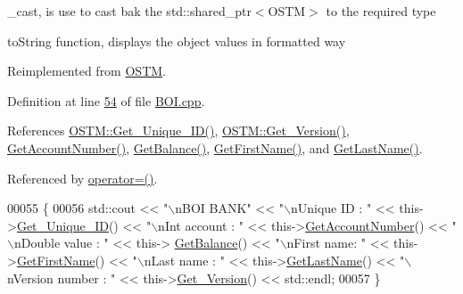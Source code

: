 \+\_\+cast, is use to cast bak the std\+::shared\+\_\+ptr$<$\+O\+S\+T\+M$>$ to the required type 

to\+String function, displays the object values in formatted way 

Reimplemented from \hyperlink{class_o_s_t_m_a513396a115f2987fd07c203309ae8a59_a513396a115f2987fd07c203309ae8a59}{O\+S\+TM}.



Definition at line \hyperlink{_b_o_i_8cpp_source_l00054}{54} of file \hyperlink{_b_o_i_8cpp_source}{B\+O\+I.\+cpp}.



References \hyperlink{_o_s_t_m_8cpp_source_l00073}{O\+S\+T\+M\+::\+Get\+\_\+\+Unique\+\_\+\+I\+D()}, \hyperlink{_o_s_t_m_8cpp_source_l00089}{O\+S\+T\+M\+::\+Get\+\_\+\+Version()}, \hyperlink{_b_o_i_8cpp_source_l00078}{Get\+Account\+Number()}, \hyperlink{_b_o_i_8cpp_source_l00070}{Get\+Balance()}, \hyperlink{_b_o_i_8cpp_source_l00094}{Get\+First\+Name()}, and \hyperlink{_b_o_i_8cpp_source_l00086}{Get\+Last\+Name()}.



Referenced by \hyperlink{_b_o_i_8h_source_l00065}{operator=()}.


\begin{DoxyCode}
00055 \{
00056    std::cout << \textcolor{stringliteral}{"\(\backslash\)nBOI BANK"} << \textcolor{stringliteral}{"\(\backslash\)nUnique ID : "} << this->\hyperlink{class_o_s_t_m_a5a01a8b98d16b1d1904ecf9356e7b71d_a5a01a8b98d16b1d1904ecf9356e7b71d}{Get\_Unique\_ID}() << \textcolor{stringliteral}{"\(\backslash\)nInt account : 
      "} << this->\hyperlink{class_b_o_i_a5b18e1538f3d37835234946cdf9f240f_a5b18e1538f3d37835234946cdf9f240f}{GetAccountNumber}() << \textcolor{stringliteral}{"\(\backslash\)nDouble value : "} << this->
      \hyperlink{class_b_o_i_a25b289dece2a1685bb9d1a9332c9be0b_a25b289dece2a1685bb9d1a9332c9be0b}{GetBalance}() << \textcolor{stringliteral}{"\(\backslash\)nFirst name: "} << this->\hyperlink{class_b_o_i_ab4b9d50c6008a666aa4382def580e7d1_ab4b9d50c6008a666aa4382def580e7d1}{GetFirstName}() << \textcolor{stringliteral}{"\(\backslash\)nLast name : "} << 
      this->\hyperlink{class_b_o_i_a37828f3fa4a32f522966e2cad90eaab2_a37828f3fa4a32f522966e2cad90eaab2}{GetLastName}()  << \textcolor{stringliteral}{"\(\backslash\)nVersion number : "} << this->\hyperlink{class_o_s_t_m_a1f1db9d482f22c8e7caa17dfb340626b_a1f1db9d482f22c8e7caa17dfb340626b}{Get\_Version}() << std::endl;
00057 \}
\end{DoxyCode}


